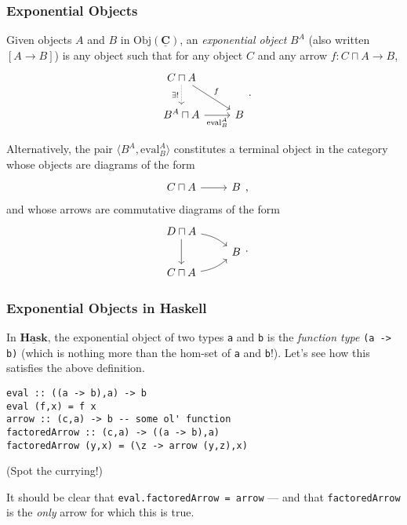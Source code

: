 \documentclass[10pt]{beamer}
\newcommand{\Cat}[1]{\ensuremath{\underline{\mathbf{#1}}}}
\newcommand{\Obj}[1]{\ensuremath{\mathrm{Obj}(\Cat{#1})}}
\theoremstyle{definition}
\theoremstyle{remark}
\numberwithin{equation}{section}
\begin{document}
\begin{frame}[fragile]
  \frametitle{Exponential Objects}

  Given objects $A$ and $B$ in $\Obj{C}$, an \emph{exponential object} $B^A$
  (also written $[A \rightarrow B]$) is any object such that for any object $C$ and any
  arrow $f\colon C \sqcap A \rightarrow B$,
  \[
    \begin{tikzcd}
      C \sqcap A \arrow[swap,densely dotted]{d}{\exists!} \arrow{dr}{f} & \\
      B^A \sqcap A \arrow[swap]{r}{\mathrm{eval}_B^A} & B
    \end{tikzcd}\rlap{.}
  \]

  Alternatively, the pair $\langle {B^A,\mathrm{eval}_B^A} \rangle$ constitutes a terminal
  object in the category whose objects are diagrams of the form
  \[
    \begin{tikzcd}
      C \sqcap A \arrow{r} & B
    \end{tikzcd}\rlap{,}
  \]
  and whose arrows are commutative diagrams of the form
  \[
    \begin{tikzcd}[row sep=tiny]
      D \sqcap A \arrow{dd} \arrow[bend left=15]{dr} & \\
      & B \\
      C \sqcap A \arrow[bend right=15]{ur} &
    \end{tikzcd}\rlap{.}
  \]
\end{frame}

\begin{frame}
  \frametitle{Exponential Objects in Haskell}

  In $\Cat{Hask}$, the exponential object of two types \lstinline{a} and
  \lstinline{b} is the \emph{function type} \lstinline{(a -> b)} (which is
  nothing more than the hom-set of \lstinline{a} and \lstinline{b}!). Let's see
  how this satisfies the above definition.

\begin{lstlisting}[frame=single]
eval :: ((a -> b),a) -> b
eval (f,x) = f x
arrow :: (c,a) -> b -- some ol' function
factoredArrow :: (c,a) -> ((a -> b),a)
factoredArrow (y,x) = (\z -> arrow (y,z),x)
\end{lstlisting}
  {\footnotesize{(Spot the currying!)}}

  It should be clear that \lstinline{eval.factoredArrow = arrow} --- and that
  \lstinline{factoredArrow} is the \emph{only} arrow for which this is true.
\end{frame}
\end{document}
